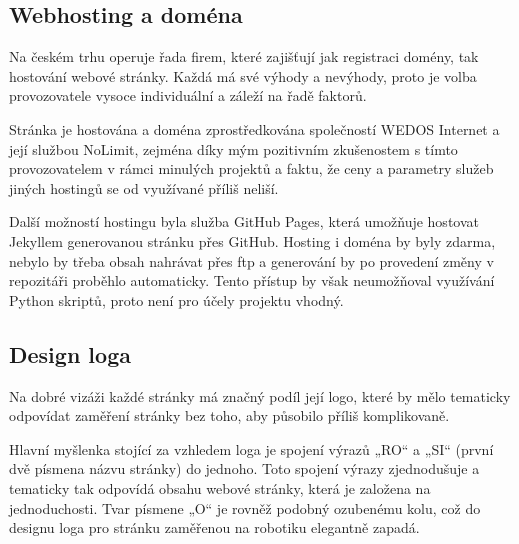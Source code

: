 \documentclass[a4paper, 12pt, twoside]{article}
\begin{document}
  \subsection{Webhosting a doména} \label{sec:Webhosting a doména}
  Na českém trhu operuje řada firem, které zajišťují jak registraci domény, tak hostování webové stránky. Každá má své výhody a nevýhody, proto je volba provozovatele vysoce individuální a záleží na řadě faktorů.

  Stránka je hostována a doména zprostředkována společností WEDOS Internet a její službou NoLimit, zejména díky mým pozitivním zkušenostem s tímto provozovatelem v rámci minulých projektů a faktu, že ceny a parametry služeb jiných hostingů se od využívané příliš neliší.

  Další možností hostingu byla služba GitHub Pages, která umožňuje hostovat Jekyllem generovanou stránku přes GitHub. Hosting i doména by byly zdarma, nebylo by třeba obsah nahrávat přes \acrshort{ftp} a generování by po provedení změny v repozitáři proběhlo automaticky. Tento přístup by však neumožňoval využívání Python skriptů, proto není pro účely projektu vhodný.


  \subsection{Design loga}
  Na dobré vizáži každé stránky má značný podíl její logo, které by mělo tematicky odpovídat zaměření stránky bez toho, aby působilo příliš komplikovaně.

  Hlavní myšlenka stojící za vzhledem loga je spojení výrazů „RO“ a „SI“ (první dvě písmena názvu stránky) do jednoho. Toto spojení výrazy zjednodušuje a tematicky tak odpovídá obsahu webové stránky, která je založena na jednoduchosti. Tvar písmene „O“ je rovněž podobný ozubenému kolu, což do designu loga pro stránku zaměřenou na robotiku elegantně zapadá.
\end{document}
